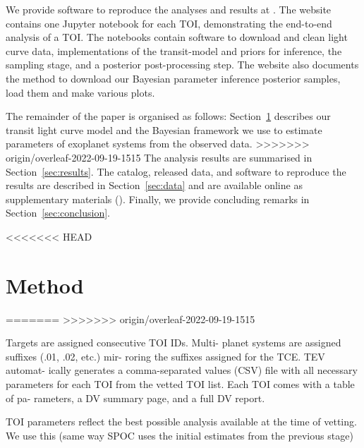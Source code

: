 \documentclass[floatfix,ApJL,twocolumn]{aastex631}
\begin{document}
We provide software to reproduce the analyses and results at \atlasUrl. 
The website contains one Jupyter notebook for each TOI, demonstrating the end-to-end analysis of a TOI. 
The notebooks contain software to download and clean light curve data, implementations of the transit-model and priors for inference, the \pymc sampling stage, and a posterior post-processing step.
The website also documents the method to download our Bayesian parameter inference posterior samples, load them and make various plots.  


The remainder of the paper is organised as follows: Section~\ref{sec:method} describes our transit light curve model and the Bayesian framework we use to estimate parameters of exoplanet systems from the observed data. 
>>>>>>> origin/overleaf-2022-09-19-1515
The analysis results are summarised in Section~\ref{sec:results}.
The catalog, released data, and software to reproduce the results are described in Section~\ref{sec:data} and are available online as supplementary materials (\atlasUrl).
Finally, we provide concluding remarks in Section~\ref{sec:conclusion}.

<<<<<<< HEAD

\section{Method} \label{sec:method}
=======
>>>>>>> origin/overleaf-2022-09-19-1515


Targets are assigned consecutive TOI IDs. Multi- planet systems are assigned suffixes (.01, .02, etc.) mir- roring the suffixes assigned for the TCE. TEV automat- ically generates a comma-separated values (CSV) file with all necessary parameters for each TOI from the vetted TOI list. Each TOI comes with a table of pa- rameters, a DV summary page, and a full DV report.

TOI parameters reflect the best possible analysis available at the time of vetting.
We use this (same way SPOC uses the initial estimates from the previous stage)



\end{document}
